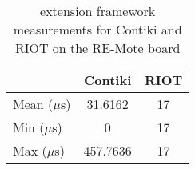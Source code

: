 \begin{table}[!ht]
  \centering
  \begin{tabular}{l|c|c}
                & Contiki  & RIOT \\ \hline
  Mean ($\mu$s) & 31.6162  & 17      \\
  Min  ($\mu$s) & 0        & 17      \\
  Max  ($\mu$s) & 457.7636 & 17     
  \end{tabular}
  \caption{extension framework measurements for Contiki and RIOT on the RE-Mote board}
  \label{tab:extension-framework-remote}
  \end{table}